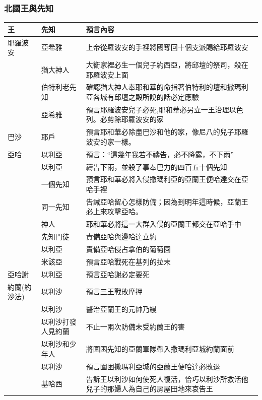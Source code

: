 \subsubsection{北國王與先知}
\begin{table}[!hbp]
\centering
\begin{tabular}{|p{1.3cm}|p{2.5cm}|p{13cm}|}
\hline
\hline
 王  &先知 &預言內容\\\hline\hline
 耶羅波安&亞希雅 &上帝從羅波安的手裡將國奪回十個支派賜給耶羅波安\\\hline
     & 猶大神人 &大衛家裡必生一個兒子約西亞，將邱壇的祭司，殺在耶羅波安上面\\\hline 
     &伯特利老先知 &確認猶大神人奉耶和華的命指著伯特利的壇和撒瑪利亞各城有邱壇之殿所說的話必定應驗\\\hline
     &亞希雅&預言耶羅波安兒子必死,耶和華必另立一王治理以色列。必剪除耶羅波安的家\\\hline 
 巴沙& 耶戶 &預言耶和華必除盡巴沙和他的家，像尼八的兒子耶羅波安的家一樣。  \\\hline
 亞哈&以利亞  &預言：“這幾年我若不禱告，必不降露，不下雨”\\\hline
     & 以利亞 & 禱告下雨，並殺了事奉巴力的四百五十個先知\\\hline 
     & 一個先知 &預言耶和華必將入侵撒瑪利亞的亞蘭王便哈達交在亞哈手裡\\\hline  
     & 同一先知 &告誡亞哈留心怎樣防備；因為到明年這時候，亞蘭王必上來攻擊亞哈。\\\hline 
      & 神人 &耶和華必將這一大群入侵的亞蘭王都交在亞哈手中\\\hline 
    & 先知門徒 &責備亞哈與邊哈達立約\\\hline 
   &以利亞  & 責備亞哈侵占拿伯的葡萄園\\\hline 
   &米該亞 & 預言亞哈戰死在基列的拉末\\\hline 
   亞哈謝 &以利亞& 預言亞哈謝必定要死\\\hline 
   約蘭(約沙法)&以利沙& 預言三王戰敗摩押 \\\hline 
        &以利沙& 醫治亞蘭王的元帥乃縵 \\\hline 
     &以利沙打發人見約蘭&不止一兩次防備未受約蘭王的害 \\\hline 
      &以利沙和少年人& 將圍困先知的亞蘭軍隊帶入撒瑪利亞城約蘭面前 \\\hline  
       &以利沙& 預言圍困撒瑪利亞城的亞蘭王便哈達必敗退 \\\hline 
       & 基哈西 & 告訴王以利沙如何使死人復活，恰巧以利沙所救活他兒子的那婦人為自己的房屋田地來哀告王\\\hline 

\end{tabular}
\end{table}
